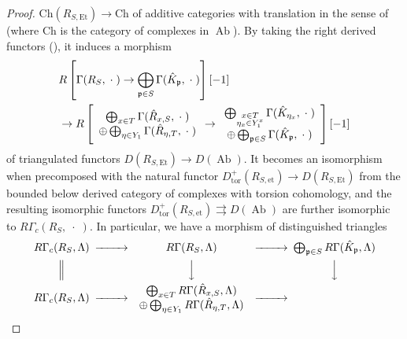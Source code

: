 \documentclass{amsart}
\theoremstyle{remark}
\numberwithin{equation}{section}
\newcommand{\et}{\mathrm{et}}
\newcommand{\Et}{\mathrm{Et}}
\newcommand{\tor}{\mathrm{tor}}
\newcommand{\var}{\;\cdot\;}
\newcommand{\Ch}{\mathrm{Ch}}
\newcommand{\ideal}[1]{\mathfrak{#1}}
\DeclareMathOperator{\Ab}{Ab}
\begin{document}
\begin{proof}
	$\Ch(R_{S, \Et}) \to \Ch$ of additive categories with translation
	in the sense of \cite[Definition 10.1.1]{KS06}
	(where $\Ch$ is the category of complexes in $\Ab$).
	By taking the right derived functors (\cite[Sections 13.3, 14.3]{KS06}), it induces a morphism
		\begin{align*}
			&
					R \left[
							\Gamma(R_{S}, \var)
						\to
							\bigoplus_{\ideal{p} \in S}
								\Gamma(\Hat{K}_{\ideal{p}}, \var)
					\right][-1]
			\\
			&	\to
					R \left[
							\begin{array}{c}
									\bigoplus_{x \in T}
										\Gamma(\Hat{R}_{x, S}, \var)
								\\
								\oplus
									\bigoplus_{\eta \in Y_{1}}
										\Gamma(\Hat{R}_{\eta, T}, \var)
							\end{array}
						\to
							\begin{array}{c}
									\bigoplus_{
										\substack{
											x \in T \\
											\eta_{x} \in Y_{1}^{x}
										}
									}
										\Gamma(\Hat{K}_{\eta_{x}}, \var)
								\\
								\oplus
									\bigoplus_{\ideal{p} \in S}
										\Gamma(\Hat{K}_{\ideal{p}}, \var)
							\end{array}
					\right][-1]
		\end{align*}
	of triangulated functors $D(R_{S, \Et}) \to D(\Ab)$.
	It becomes an isomorphism
	when precomposed with the natural functor $D_{\tor}^{+}(R_{S, \et}) \to D(R_{S, \Et})$
	from the bounded below derived category of complexes with torsion cohomology,
	and the resulting isomorphic functors $D_{\tor}^{+}(R_{S, \et}) \rightrightarrows D(\Ab)$
	are further isomorphic to $R \Gamma_{c}(R_{S}, \var)$.
	In particular, we have a morphism of distinguished triangles
		\[
			\begin{CD}
					R \Gamma_{c}(R_{S}, \Lambda)
				@>>>
					R \Gamma(R_{S}, \Lambda)
				@>>>
					\bigoplus_{\ideal{p} \in S}
						R \Gamma(\Hat{K}_{\ideal{p}}, \Lambda)
				\\ @| @VVV @VVV \\
					R \Gamma_{c}(R_{S}, \Lambda)
				@>>>
					\begin{array}{c}
							\bigoplus_{x \in T}
								R \Gamma(\Hat{R}_{x, S}, \Lambda)
						\\
						\oplus
							\bigoplus_{\eta \in Y_{1}}
								R \Gamma(\Hat{R}_{\eta, T}, \Lambda)
					\end{array}
				@>>>
					\begin{array}{c}

\end{array}
\end{CD}\]
\end{proof}
\end{document}
